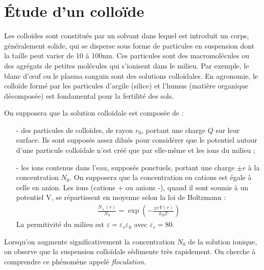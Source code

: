 \documentclass{report}
\begin{document}
\newpage

\section*{Étude d'un colloïde}

Les colloïdes sont constitués par un solvant dans lequel est introduit un corps, généralement solide, qui se disperse sous forme de particules en suspension dont la taille peut varier de 10 à 100nm. Ces particules sont des macromolécules ou des agrégats de petites molécules qui s'ionisent dans le milieu. Par exemple, le blanc d'œuf ou le plasma sanguin sont des solutions colloïdales. En agronomie, le colloïde formé par les particules d'argile (silice) et l'humus (matière organique décomposée) est fondamental pour la fertilité des sols. 

On supposera que la solution colloïdale est composée de :
\begin{itemize}
	\item[-] des particules de colloïdes, de rayon $r_0$, portant une charge $Q$ sur leur surface. Ils sont supposés assez dilués pour considérer que le potentiel autour d'une particule colloïdale n'est créé que par elle-même et les ions du milieu ;
	
	\item[-] les ions contenus dans l'eau, supposés ponctuels, portant une charge $\pm e$ à la concentration $N_0$. On supposera que la concentration en cations est égale à celle en anion. Les ions (cations + ou anions -), quand il sont soumis à un potentiel V, se répartissent en moyenne selon la loi de Boltzmann :
\begin{align*}
	\frac{N_{\pm}(r)}{N_0}=\exp\left(-\frac{\pm eV(r)}{k_BT} \right) 
\end{align*}
La permitivité du milieu est $\varepsilon=\varepsilon_r\varepsilon_0$ avec $\varepsilon_r=80$.
\end{itemize}

Lorsqu'on augmente significativement la concentration $N_0$ de la solution ionique, on observe que la suspension colloïdale sédimente très rapidement. On cherche à comprendre ce phénomène appelé \textit{floculation}.
\end{document}
